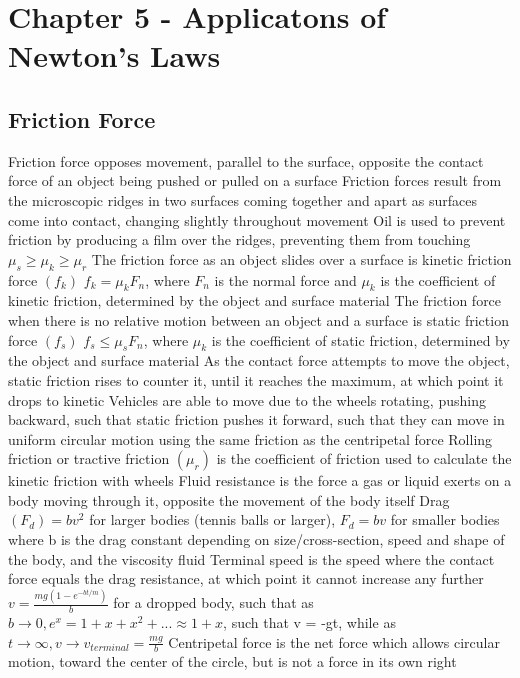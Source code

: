 \documentclass[11 pt, twoside]{article}
\newenvironment{outline*}
{
	\begin{outline}[enumerate]
	}
	{\end{outline}
}
\begin{document}
\section{Chapter 5 - Applicatons of Newton's Laws}
\subsection{Friction Force}
\begin{outline*}
\1 Friction force opposes movement, parallel to the surface, opposite the contact force of an object being pushed or pulled on a surface
\2 Friction forces result from the microscopic ridges in two surfaces coming together and apart as surfaces come into contact, changing slightly throughout movement
\2 Oil is used to prevent friction by producing a film over the ridges, preventing them from touching
\2 $\mu_s \geq \mu_k \geq \mu_r$
\1 The friction force as an object slides over a surface is kinetic friction force $(f_k)$
\2 $f_k = \mu_kF_n$, where $F_n$ is the normal force and $\mu_k$ is the coefficient of kinetic friction, determined by the object and surface material
\1 The friction force when there is no relative motion between an object and a surface is static friction force $(f_s)$
\2 $f_s \leq \mu_sF_n$, where $\mu_k$ is the coefficient of static friction, determined by the object and surface material
\2 As the contact force attempts to move the object, static friction rises to counter it, until it reaches the maximum, at which point it drops to kinetic
\2 Vehicles are able to move due to the wheels rotating, pushing backward, such that static friction pushes it forward, such that they can move in uniform circular motion using the same friction as the centripetal force
\1 Rolling friction or tractive friction $(\mu_r)$ is the coefficient of friction used to calculate the kinetic friction with wheels
\1 Fluid resistance is the force a gas or liquid exerts on a body moving through it, opposite the movement of the body itself
\2 Drag $(F_d) = bv^2$ for larger bodies (tennis balls or larger), $F_d = bv$ for smaller bodies where b is the drag constant depending on size/cross-section, speed and shape of the body, and the viscosity fluid
\2 Terminal speed is the speed where the contact force equals the drag resistance, at which point it cannot increase any further
\2 $v = \frac{mg(1 - e^{-bt/m})}{b}$ for a dropped body, such that as $b \to 0, e^x = 1 + x + x^2 +... \approx 1 + x$, such that v = -gt, while as $t \to \infty, v \to v_{terminal} = \frac{mg}{b}$
\1 Centripetal force is the net force which allows circular motion, toward the center of the circle, but is not a force in its own right
\end{outline*}
\end{document}
